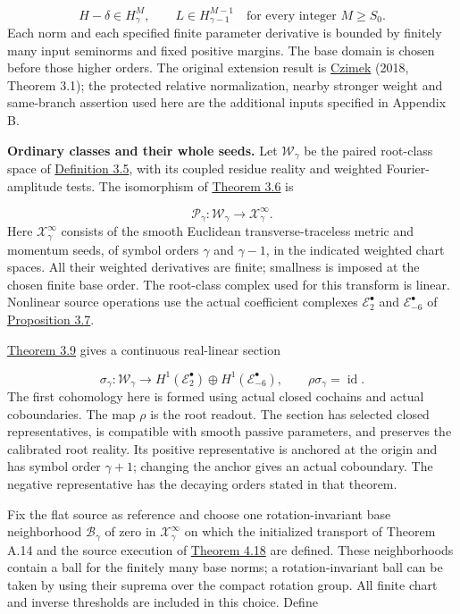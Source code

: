 \documentclass[
  english,
  11pt,
  reqno]{amsart}
\begin{document}
\label{eq:submission-relative-extension-input} \[
H-\delta\in H^M_\gamma,\qquad
L\in H^{M-1}_{\gamma-1}
\quad\text{for every integer }M\ge S_0.
\] Each norm and each specified finite parameter derivative is bounded
by finitely many input seminorms and fixed positive margins. The base
domain is chosen before those higher orders. The original extension
result is \hyperref[ref-Czimek2018]{Czimek} (2018, Theorem 3.1); the
protected relative normalization, nearby stronger weight and same-branch
assertion used here are the additional inputs specified in Appendix B.

\textbf{Ordinary classes and their whole seeds.} Let
\(\mathscr W_\gamma\) be the paired root-class space of
\hyperref[def:online-weighted-root-domain]{Definition 3.5}, with its
coupled residue reality and weighted Fourier-amplitude tests. The
isomorphism of \hyperref[thm:online-root-seed-isomorphism]{Theorem 3.6}
is

\label{eq:submission-root-seed-transform} \[
\mathscr P_\gamma:\mathscr W_\gamma
\longrightarrow\mathcal X^\infty_\gamma.
\] Here \(\mathcal X^\infty_\gamma\) consists of the smooth Euclidean
transverse-traceless metric and momentum seeds, of symbol orders
\(\gamma\) and \(\gamma-1\), in the indicated weighted chart spaces. All
their weighted derivatives are finite; smallness is imposed at the
chosen finite base order. The root-class complex used for this transform
is linear. Nonlinear source operations use the actual coefficient
complexes \(\mathscr E_2^\bullet\) and \(\mathscr E_{-6}^\bullet\) of
\hyperref[prop:online-actual-coefficient-exact-sequence]{Proposition
3.7}.

\hyperref[thm:online-canonical-actual-pair-lift]{Theorem 3.9} gives a
continuous real-linear section

\label{eq:submission-actual-ordinary-lift} \[
\sigma_\gamma:\mathscr W_\gamma
\longrightarrow
H^1(\mathscr E_2^\bullet)\oplus
H^1(\mathscr E_{-6}^\bullet),
\qquad
\rho\sigma_\gamma=\operatorname{id}.
\] The first cohomology here is formed using actual closed cochains and
actual coboundaries. The map \(\rho\) is the root readout. The section
has selected closed representatives, is compatible with smooth passive
parameters, and preserves the calibrated root reality. Its positive
representative is anchored at the origin and has symbol order
\(\gamma+1\); changing the anchor gives an actual coboundary. The
negative representative has the decaying orders stated in that theorem.

Fix the flat source as reference and choose one rotation-invariant base
neighborhood \(\mathcal B_\gamma\) of zero in
\(\mathcal X^\infty_\gamma\) on which the initialized transport of
Theorem A.14 and the source execution of
\hyperref[thm:online-ordinary-negative-response-initial-source]{Theorem
4.18} are defined. These neighborhoods contain a ball for the finitely
many base norms; a rotation-invariant ball can be taken by using their
suprema over the compact rotation group. All finite chart and inverse
thresholds are included in this choice. Define
\end{document}
